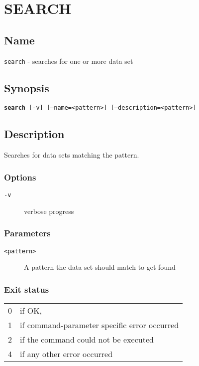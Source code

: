 \documentclass{article} %
\begin{document}
		\section*{SEARCH}
		\subsection*{Name}
		\texttt{search} - searches for one or more data set
		\subsection*{Synopsis}
		\texttt{\textbf{search} [-v] [--name=<pattern>] [--description=<pattern>]}
		\subsection*{Description}
		Searches for data sets matching the pattern.\\
		
		\noindent
		\subsubsection*{Options}
		\begin{description}
			\item[\texttt{-v}] verbose progress
		\end{description}
		
		\subsubsection*{Parameters}
		\begin{description}
			\item[\texttt{<pattern>}] A pattern the data set should match to get found
		\end{description}
		\subsubsection*{Exit status}
		\begin{tabular}{ll}
			0 &  if OK,\\ 
			1 &  if command-parameter specific error occurred\\
			2 &  if the command could not be executed\\
			4 &  if any other error occurred\\
		\end{tabular}
		\newpage
\end{document}
